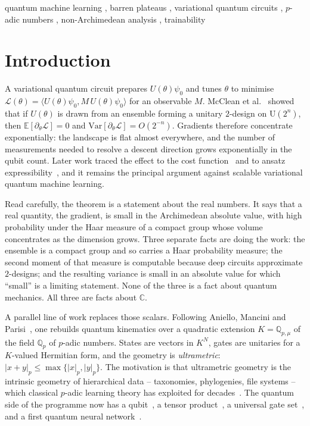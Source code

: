 \documentclass{ceurart}
\theoremstyle{plain}
\theoremstyle{definition}
\theoremstyle{remark}
\theoremstyle{plain}
\newcommand{\Qp}{\mathbb{Q}_p}
\newcommand{\Qpmu}{\mathbb{Q}_{p,\mu}}
\newcommand{\padicnorm}[1]{\left|#1\right|_p}
\newcommand{\inner}[2]{\langle #1, #2\rangle}
\newcommand{\loss}{\mathcal{L}}
\begin{document}
\begin{keywords}
  quantum machine learning \sep
  barren plateaus \sep
  variational quantum circuits \sep
  $p$-adic numbers \sep
  non-Archimedean analysis \sep
  trainability
\end{keywords}

\maketitle

\section{Introduction}
\label{sec:intro}

A variational quantum circuit prepares $U(\theta)\psi_0$ and tunes $\theta$ to
minimise $\loss(\theta)=\inner{U(\theta)\psi_0}{M\,U(\theta)\psi_0}$ for an
observable $M$. McClean et al.~\cite{Mc18} showed that if $U(\theta)$ is drawn
from an ensemble forming a unitary $2$-design on $\mathrm{U}(2^n)$, then
$\mathbb{E}[\partial_\theta\loss]=0$ and
$\mathrm{Var}[\partial_\theta\loss]=O(2^{-n})$. Gradients therefore concentrate
exponentially: the landscape is flat almost everywhere, and the number of
measurements needed to resolve a descent direction grows exponentially in the
qubit count. Later work traced the effect to the cost function~\cite{Ce21} and
to ansatz expressibility~\cite{Ho22}, and it remains the principal argument
against scalable variational quantum machine learning.

Read carefully, the theorem is a statement about the real numbers. It says that
a real quantity, the gradient, is small in the Archimedean absolute value, with
high probability under the Haar measure of a compact group whose volume
concentrates as the dimension grows. Three separate facts are doing the work:
the ensemble is a compact group and so carries a Haar probability measure; the
second moment of that measure is computable because deep circuits approximate
$2$-designs; and the resulting variance is small in an absolute value for which
``small'' is a limiting statement. None of the three is a fact about quantum
mechanics. All three are facts about $\mathbb{C}$.

A parallel line of work replaces those scalars. Following Aniello, Mancini and
Parisi~\cite{AMP23,AMP24,AMP23trace}, one rebuilds quantum kinematics over a
quadratic extension $K=\Qpmu$ of the field $\Qp$ of $p$-adic numbers. States
are vectors in $K^{N}$, gates are unitaries for a $K$-valued Hermitian form,
and the geometry is \emph{ultrametric}:
$\padicnorm{x+y}\le\max\{\padicnorm x,\padicnorm y\}$. The motivation is that
ultrametric geometry is the intrinsic geometry of hierarchical data --
taxonomies, phylogenies, file systems -- which classical $p$-adic learning
theory has exploited for decades~\cite{Kh98,ZuGa22,ZG24dnn,Ma25}. The quantum
side of the programme now has a qubit~\cite{SMW22qub}, a tensor
product~\cite{Mu25tensor}, a universal gate set~\cite{SLMW26gates}, and a first
quantum neural network~\cite{ZGZ26qnn}.
\end{document}
